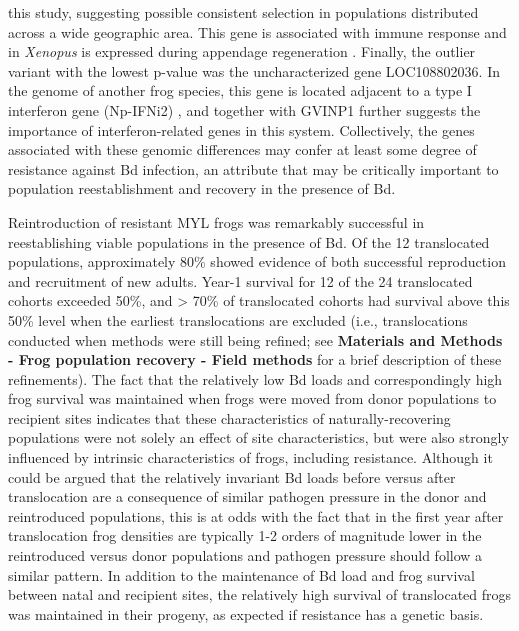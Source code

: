 \documentclass[9pt,twocolumn,twoside,lineno]{pnas-new}
\begin{document}
this study, suggesting possible consistent selection in populations
distributed across a wide geographic area. This gene is associated with
immune response and in \emph{Xenopus} is expressed during appendage
regeneration \citep{fukazawa2009}. Finally, the outlier variant with the
lowest p-value was the uncharacterized gene LOC108802036. In the genome
of another frog species, this gene is located adjacent to a type I
interferon gene (Np-IFNi2) \citep{gan2018}, and together with GVINP1
further suggests the importance of interferon-related genes in this
system. Collectively, the genes associated with these genomic
differences may confer at least some degree of resistance against Bd
infection, an attribute that may be critically important to population
reestablishment and recovery in the presence of Bd.

Reintroduction of resistant MYL frogs was remarkably successful in
reestablishing viable populations in the presence of Bd. Of the 12
translocated populations, approximately 80\% showed evidence of both
successful reproduction and recruitment of new adults. Year-1 survival
for 12 of the 24 translocated cohorts exceeded 50\%, and \textgreater{}
70\% of translocated cohorts had survival above this 50\% level when the
earliest translocations are excluded (i.e., translocations conducted
when methods were still being refined; see \textbf{Materials and Methods
- Frog population recovery - Field methods} for a brief description of
these refinements). The fact that the relatively low Bd loads and
correspondingly high frog survival was maintained when frogs were moved
from donor populations to recipient sites indicates that these
characteristics of naturally-recovering populations were not solely an
effect of site characteristics, but were also strongly influenced by
intrinsic characteristics of frogs, including resistance. Although it
could be argued that the relatively invariant Bd loads before versus
after translocation are a consequence of similar pathogen pressure in
the donor and reintroduced populations, this is at odds with the fact
that in the first year after translocation frog densities are typically
1-2 orders of magnitude lower in the reintroduced versus donor
populations and pathogen pressure should follow a similar pattern. In
addition to the maintenance of Bd load and frog survival between natal
and recipient sites, the relatively high survival of translocated frogs
was maintained in their progeny, as expected if resistance has a genetic
basis.
\end{document}

